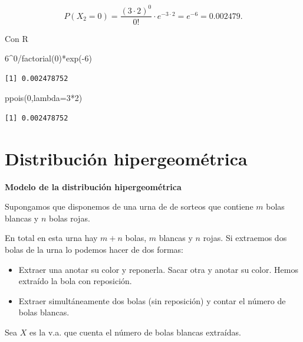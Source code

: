 \documentclass[
  letterpaper,
  DIV=11,
  numbers=noendperiod]{scrreprt}
\newenvironment{Shaded}{\begin{snugshade}}{\end{snugshade}}
\newcommand{\AttributeTok}[1]{\textcolor[rgb]{0.40,0.45,0.13}{#1}}
\newcommand{\DecValTok}[1]{\textcolor[rgb]{0.68,0.00,0.00}{#1}}
\newcommand{\FunctionTok}[1]{\textcolor[rgb]{0.28,0.35,0.67}{#1}}
\newcommand{\NormalTok}[1]{\textcolor[rgb]{0.00,0.23,0.31}{#1}}
\newcommand{\SpecialCharTok}[1]{\textcolor[rgb]{0.37,0.37,0.37}{#1}}
\providecommand{\tightlist}{%
  \setlength{\itemsep}{0pt}\setlength{\parskip}{0pt}}\usepackage{longtable,booktabs,array}
\begin{document}
\[P(X_2=0)=\frac{(3\cdot 2)^0}{0!}\cdot e^{-3\cdot 2}= e^{-6}=0.002479.\]

Con R

\begin{Shaded}
\begin{Highlighting}[]
\DecValTok{6}\SpecialCharTok{\^{}}\DecValTok{0}\SpecialCharTok{/}\FunctionTok{factorial}\NormalTok{(}\DecValTok{0}\NormalTok{)}\SpecialCharTok{*}\FunctionTok{exp}\NormalTok{(}\SpecialCharTok{{-}}\DecValTok{6}\NormalTok{)}
\end{Highlighting}
\end{Shaded}

\begin{verbatim}
[1] 0.002478752
\end{verbatim}

\begin{Shaded}
\begin{Highlighting}[]
\FunctionTok{ppois}\NormalTok{(}\DecValTok{0}\NormalTok{,}\AttributeTok{lambda=}\DecValTok{3}\SpecialCharTok{*}\DecValTok{2}\NormalTok{)}
\end{Highlighting}
\end{Shaded}

\begin{verbatim}
[1] 0.002478752
\end{verbatim}

\section{Distribución
hipergeométrica}\label{distribuciuxf3n-hipergeomuxe9trica}

\textbf{Modelo de la distribución hipergeométrica}

Supongamos que disponemos de una urna de de sorteos que contiene \(m\)
bolas blancas y \(n\) bolas rojas.

En total en esta urna hay \(m+n\) bolas, \(m\) blancas y \(n\) rojas. Si
extraemos dos bolas de la urna lo podemos hacer de dos formas:

\begin{itemize}
\tightlist
\item
  Extraer una anotar su color y reponerla. Sacar otra y anotar su color.
  Hemos extraído la bola con reposición.
\item
  Extraer simultáneamente dos bolas (sin reposición) y contar el número
  de bolas blancas.
\end{itemize}

Sea \(X\) es la v.a. que cuenta el número de bolas blancas extraídas.
\end{document}
